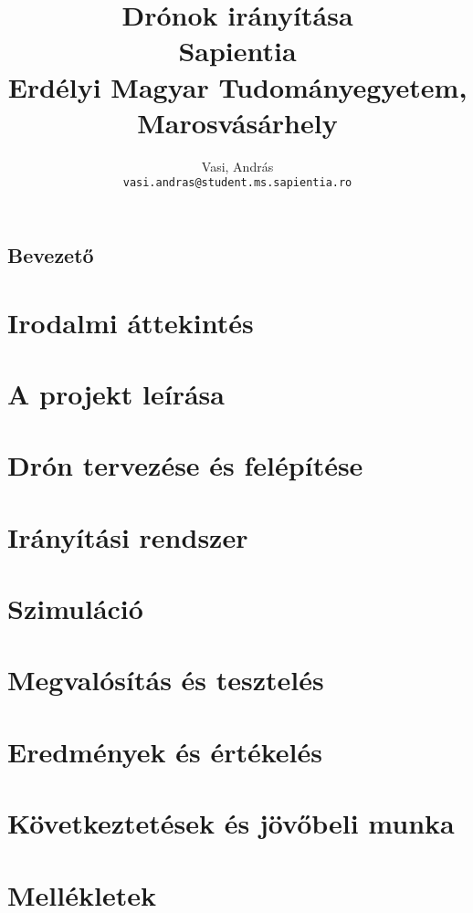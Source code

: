 \documentclass[12pt, twosides]{report}
\title{
	{Drónok irányítása}\\
	{\large Sapientia\\
	Erdélyi Magyar Tudományegyetem, Marosvásárhely}
}
\author{
	Vasi, András\\
	\texttt{vasi.andras@student.ms.sapientia.ro}	
}
\begin{document}

\tableofcontents

\listoffigures

\section{Bevezető}


\chapter{Irodalmi áttekintés}


\chapter{A projekt leírása}


\chapter{Drón tervezése és felépítése}


\chapter{Irányítási rendszer}


\chapter{Szimuláció}


\chapter{Megvalósítás és tesztelés}


\chapter{Eredmények és értékelés}


\chapter{Következtetések és jövőbeli munka}


\chapter{Mellékletek}





% 
\end{document}
